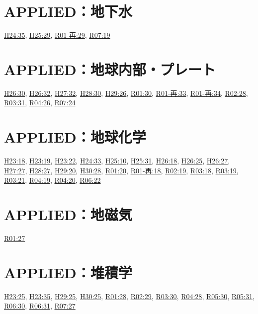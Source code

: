 \section{APPLIED：地下水}
\hyperref[q:h24-reg-applied-35]{H24:35}, \hyperref[q:h25-reg-applied-29]{H25:29}, \hyperref[q:r01-ret-applied-29]{R01-再:29}, \hyperref[q:r07-reg-applied-19]{R07:19}
\section{APPLIED：地球内部・プレート}
\hyperref[q:h26-reg-applied-30]{H26:30}, \hyperref[q:h26-reg-applied-32]{H26:32}, \hyperref[q:h27-reg-applied-32]{H27:32}, \hyperref[q:h28-reg-applied-30]{H28:30}, \hyperref[q:h29-reg-applied-26]{H29:26}, \hyperref[q:r01-reg-applied-30]{R01:30}, \hyperref[q:r01-ret-applied-33]{R01-再:33}, \hyperref[q:r01-ret-applied-34]{R01-再:34}, \hyperref[q:r02-reg-applied-28]{R02:28}, \hyperref[q:r03-reg-applied-31]{R03:31}, \hyperref[q:r04-reg-applied-26]{R04:26}, \hyperref[q:r07-reg-applied-24]{R07:24}
\section{APPLIED：地球化学}
\hyperref[q:h23-reg-applied-18]{H23:18}, \hyperref[q:h23-reg-applied-19]{H23:19}, \hyperref[q:h23-reg-applied-22]{H23:22}, \hyperref[q:h24-reg-applied-33]{H24:33}, \hyperref[q:h25-reg-applied-10]{H25:10}, \hyperref[q:h25-reg-applied-31]{H25:31}, \hyperref[q:h26-reg-applied-18]{H26:18}, \hyperref[q:h26-reg-applied-25]{H26:25}, \hyperref[q:h26-reg-applied-27]{H26:27}, \hyperref[q:h27-reg-applied-27]{H27:27}, \hyperref[q:h28-reg-applied-27]{H28:27}, \hyperref[q:h29-reg-applied-20]{H29:20}, \hyperref[q:h30-reg-applied-28]{H30:28}, \hyperref[q:r01-reg-applied-20]{R01:20}, \hyperref[q:r01-ret-applied-18]{R01-再:18}, \hyperref[q:r02-reg-applied-19]{R02:19}, \hyperref[q:r03-reg-applied-18]{R03:18}, \hyperref[q:r03-reg-applied-19]{R03:19}, \hyperref[q:r03-reg-applied-21]{R03:21}, \hyperref[q:r04-reg-applied-19]{R04:19}, \hyperref[q:r04-reg-applied-20]{R04:20}, \hyperref[q:r06-reg-applied-22]{R06:22}
\section{APPLIED：地磁気}
\hyperref[q:r01-reg-applied-27]{R01:27}
\section{APPLIED：堆積学}
\hyperref[q:h23-reg-applied-25]{H23:25}, \hyperref[q:h23-reg-applied-35]{H23:35}, \hyperref[q:h29-reg-applied-25]{H29:25}, \hyperref[q:h30-reg-applied-25]{H30:25}, \hyperref[q:r01-reg-applied-28]{R01:28}, \hyperref[q:r02-reg-applied-29]{R02:29}, \hyperref[q:r03-reg-applied-30]{R03:30}, \hyperref[q:r04-reg-applied-28]{R04:28}, \hyperref[q:r05-reg-applied-30]{R05:30}, \hyperref[q:r05-reg-applied-31]{R05:31}, \hyperref[q:r06-reg-applied-30]{R06:30}, \hyperref[q:r06-reg-applied-31]{R06:31}, \hyperref[q:r07-reg-applied-27]{R07:27}
